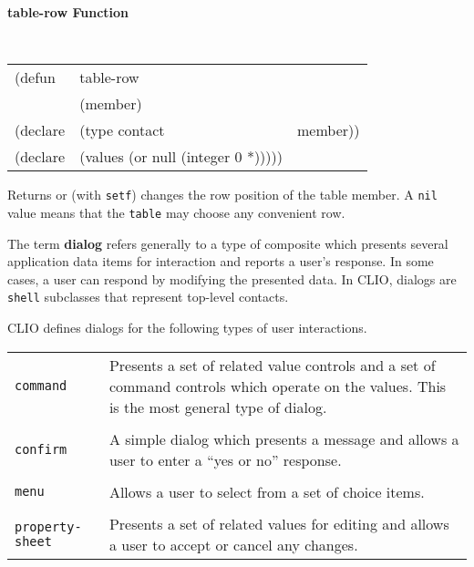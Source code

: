 {\samepage
{\large {\bf table-row \hfill Function}}
\begin{flushright} \parbox[t]{6.125in}{
\tt
\begin{tabular}{lll}
\raggedright
(defun & table-row & \\
& (member) \\
(declare &(type contact & member))\\
(declare & (values (or null (integer 0 *)))))
\end{tabular}
\rm

}\end{flushright}}

\begin{flushright} \parbox[t]{6.125in}{
Returns or (with {\tt setf}) changes the row position of the table member.
A {\tt nil} value means that the {\tt table} may choose any
convenient row.}\end{flushright}




 The term {\bf dialog}
refers generally to a type of composite which presents several application data
items for interaction and  reports a user's response.  In some cases,
a user can respond by modifying the presented data. In CLIO, dialogs are {\tt
shell} subclasses that represent top-level contacts.

CLIO defines dialogs for the following types of user interactions.
\begin{center}
\begin{tabular}[t]{lp{5in}}
{\tt command} & Presents a set of related value controls and a set of command
controls which operate on the values. This is the most general type of dialog.\\ 
\\
{\tt confirm} & A simple dialog which presents a message and allows a user to
enter a ``yes or no'' response.\\
\\
{\tt menu} & Allows a user to select from a set of choice items.\\
\\
{\tt property-sheet} & Presents a set of related
values for editing and allows a user to accept or cancel any changes.\\

\end{tabular}
\end{center}

